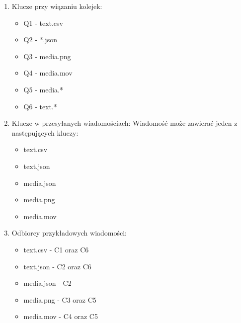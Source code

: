 \documentclass{article}
\begin{document}
        \begin{enumerate}
            \item Klucze przy wiązaniu kolejek: \begin{itemize}
                \item Q1 - text.csv
                \item Q2 - *.json
                \item Q3 - media.png
                \item Q4 - media.mov
                \item Q5 - media.*
                \item Q6 - text.*
                \end{itemize}
            \item Klucze w przesyłanych wiadomościach:
                Wiadomość może zawierać jeden z następujących kluczy:
                \begin{itemize}
                    \item text.csv
                    \item text.json
                    \item media.json
                    \item media.png
                    \item media.mov
                \end{itemize}
            \item Odbiorcy przykładowych wiadomości: 
                \begin{itemize}
                    \item text.csv - C1 oraz C6
                    \item text.json - C2 oraz C6
                    \item media.json - C2
                    \item media.png - C3 oraz C5
                    \item media.mov - C4 oraz C5
                \end{itemize}
        \end{enumerate}
\end{document}
